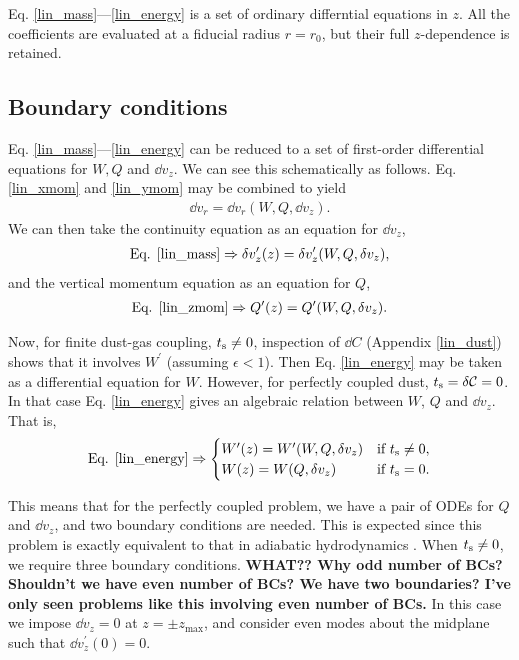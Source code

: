Eq. \ref{lin_mass}---\ref{lin_energy} is a set of ordinary
differntial equations in $z$. All the coefficients are evaluated at a
fiducial radius $r=r_0$, but their full $z$-dependence is retained.  
\subsection{Boundary conditions}
Eq. \ref{lin_mass}---\ref{lin_energy} can be reduced to a set of
first-order differential equations for $W, Q$ and $\dd v_z$. We can
see this schematically as follows. Eq. \ref{lin_xmom} and
\ref{lin_ymom} may be combined to yield 
\begin{align*}
  \dd v_r = \dd v_r (W, Q, \dd v_z). 
\end{align*} 
We can then take the continuity equation as an equation for $\dd v_z$, 
\begin{align*}
\text{Eq. \ref{lin_mass}} \Rightarrow \delta v_z^\prime(z) = \delta
  v_z^\prime(W,Q,\delta v_z),
\end{align*}
and the vertical momentum equation as an equation for $Q$, 
\begin{align*}
\text{Eq. \ref{lin_zmom}} \Rightarrow Q^\prime(z) = 
 Q^\prime(W,Q,\delta v_z). 
\end{align*}

Now, for finite dust-gas coupling, $t_\mathrm{s}\neq0$, inspection of $\dd C$
(Appendix \ref{lin_dust}) shows that it involves $W^\prime$ (assuming
$\epsilon < 1$). Then Eq. \ref{lin_energy} may be taken as a
differential equation for $W$. However, for perfectly coupled dust,
$t_\mathrm{s} =\delta\mathcal{C}= 0$. In that case Eq. \ref{lin_energy} gives an algebraic
relation between $W$, $Q$ and $\dd v_z$. That is,
\begin{align*}
\text{Eq. \ref{lin_energy}}\Rightarrow \begin{cases}
  W^\prime(z) = W^\prime(W, Q, \delta v_z) & \text{if } t_\mathrm{s} \neq 0, \\
  W           (z) = W(Q, \delta v_z) & \text{if }t_\mathrm{s} = 0.
\end{cases}
\end{align*} 

This means that for the perfectly coupled problem, we have a pair of
ODEs for $Q$ and $\dd v_z$, and two boundary conditions are needed. 
This is expected since this problem is exactly 
equivalent to that in adiabatic hydrodynamics \citep[e.g.]{lubow93}. When
$t_\mathrm{s}\neq0$, we require three boundary conditions. {\bf WHAT?? Why odd
  number of BCs? Shouldn't we have even number of BCs? We have
two boundaries? I've only seen problems like this involving even
number of BCs.} In this case we impose $\dd v_z =0$ at $z=\pm
z_\mathrm{max}$, and consider even modes about the midplane such that
$\dd v_z^\prime(0) = 0$.    

